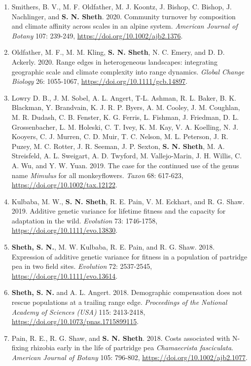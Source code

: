 \documentclass[11pt,english]{article}\usepackage[]{graphicx}\usepackage[]{xcolor}
\begin{document}
\begin{hangparas}{.5in}{1}
\begin{enumerate}
\item Smithers, B. V., M. F. Oldfather, M. J. Koontz, J. Bishop, C. Bishop, J. Nachlinger, and \textbf{S. N. Sheth}. 2020. Community turnover by composition and climate affinity across scales in an alpine system. \emph{American Journal of Botany} 107: 239-249, \url{https://doi.org/10.1002/ajb2.1376}.

\item Oldfather, M. F., M. M. Kling, \textbf{S. N. Sheth}, N. C. Emery, and D. D. Ackerly. 2020. Range edges in heterogeneous landscapes: integrating geographic scale and climate complexity into range dynamics. \emph{Global Change Biology} 26: 1055-1067, \url{https://doi.org/10.1111/gcb.14897}. 

\item Lowry D. B., J. M. Sobel, A. L. Angert, T-L. Ashman, R. L. Baker, B. K. Blackman, Y. Brandvain, K. J. R. P. Byers, A. M. Cooley, J. M. Coughlan, M. R. Dudash, C. B. Fenster, K. G. Ferris, L. Fishman, J. Friedman, D. L. Grossenbacher, L. M. Holeski, C. T. Ivey, K. M. Kay, V. A. Koelling, N. J. Kooyers, C. J. Murren, C. D. Muir, T. C. Nelson, M. L. Peterson, J. R. Puzey, M. C. Rotter, J. R. Seeman, J. P. Sexton, \textbf{S. N. Sheth}, M. A. Streisfeld, A. L. Sweigart, A. D. Twyford, M. Vallejo-Marin, J. H. Willis, C. A. Wu, and Y. W. Yuan. 2019. The case for the continued use of the genus name \textit{Mimulus} for all monkeyflowers. \emph{Taxon} 68: 617-623, \url{https://doi.org/10.1002/tax.12122}. 

\item Kulbaba, M. W., \textbf{S. N. Sheth}, R. E. Pain, V. M. Eckhart, and R. G. Shaw. 2019. Additive genetic variance for lifetime fitness and the capacity for adaptation in the wild. \emph{Evolution} 73: 1746-1758, \url{https://doi.org/10.1111/evo.13830}. 

\item \textbf{Sheth, S. N.}, M. W. Kulbaba, R. E. Pain, and R. G. Shaw. 2018. Expression of additive genetic variance for fitness in a population of partridge pea in two field sites. \emph{Evolution} 72: 2537-2545, \url{https://doi.org/10.1111/evo.13614}. 

\item \textbf{Sheth, S. N.} and A. L. Angert. 2018. Demographic compensation does not rescue populations at a trailing range edge. \emph{Proceedings of the National Academy of Sciences (USA)} 115: 2413-2418, \url{https://doi.org/10.1073/pnas.1715899115}. 

\item Pain, R. E., R. G. Shaw, and \textbf{S. N. Sheth}. 2018. Costs associated with N-fixing rhizobia early in the life of partridge pea \textit{Chamaecrista fasciculata}. \emph{American Journal of Botany} 105: 796-802, \url{https://doi.org/10.1002/ajb2.1077}. 


\end{enumerate}
\end{hangparas}
\end{document}
